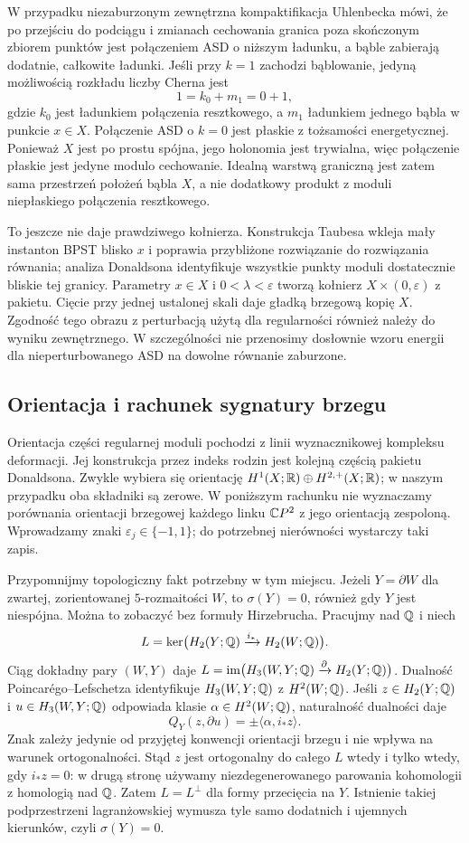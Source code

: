 W przypadku niezaburzonym zewnętrzna kompaktifikacja
Uhlenbecka mówi, że po
przejściu do podciągu i zmianach cechowania granica
poza skończonym zbiorem punktów jest połączeniem
ASD o niższym ładunku, a bąble zabierają dodatnie,
całkowite ładunki. Jeśli przy $k=1$ zachodzi
bąblowanie, jedyną możliwością rozkładu liczby
Cherna jest
\[
 1=k_0+m_1=0+1,
\]
gdzie $k_0$ jest ładunkiem połączenia resztkowego,
a $m_1$ ładunkiem jednego bąbla w punkcie $x\in X$.
Połączenie ASD o $k=0$ jest płaskie z
tożsamości energetycznej. Ponieważ $X$ jest po
prostu spójna, jego holonomia jest trywialna, więc
połączenie płaskie jest jedyne modulo cechowanie.
Idealną warstwą graniczną jest zatem sama przestrzeń
położeń bąbla $X$, a nie dodatkowy produkt z moduli
niepłaskiego połączenia resztkowego.

To jeszcze nie daje prawdziwego kołnierza. Konstrukcja
Taubesa wkleja mały instanton BPST blisko $x$ i
poprawia przybliżone rozwiązanie do rozwiązania
równania; analiza Donaldsona identyfikuje wszystkie
punkty moduli dostatecznie bliskie tej granicy.
Parametry $x\in X$ i $0<\lambda<\varepsilon$
tworzą kołnierz $X\times(0,\varepsilon)$ z pakietu.
Cięcie przy jednej ustalonej skali daje gładką
brzegową kopię $X$. Zgodność tego obrazu z perturbacją
użytą dla regularności również należy do wyniku
zewnętrznego. W szczególności nie przenosimy
dosłownie wzoru energii dla nieperturbowanego ASD
na dowolne równanie zaburzone.

\subsection*{Orientacja i rachunek sygnatury brzegu}

Orientacja części regularnej moduli pochodzi z linii
wyznacznikowej kompleksu deformacji. Jej konstrukcja
przez indeks rodzin jest kolejną częścią pakietu
Donaldsona. Zwykle wybiera się orientację
$H^1(X;\mathbb{R})\oplus H^{2,+}(X;\mathbb{R})$; w naszym przypadku
oba składniki są zerowe. W poniższym rachunku nie
wyznaczamy porównania orientacji brzegowej każdego
linku $\mathbb{C} P^2$ z jego orientacją zespoloną.
Wprowadzamy znaki $\varepsilon_j\in\{-1,1\}$;
do potrzebnej nierówności wystarczy taki zapis.

Przypomnijmy topologiczny fakt potrzebny w tym
miejscu. Jeżeli $Y=\partial W$ dla zwartej,
zorientowanej $5$-rozmaitości $W$, to $\sigma(Y)=0$,
również gdy $Y$ jest niespójna. Można to zobaczyć
bez formuły Hirzebrucha. Pracujmy nad $\mathbb{Q}$ i niech
\[
 L=\ker\bigl(H_2(Y;\mathbb{Q})\xrightarrow{i_*}H_2(W;\mathbb{Q})\bigr).
\]
Ciąg dokładny pary $(W,Y)$ daje
$L=\operatorname{im}\bigl(H_3(W,Y;\mathbb{Q})
\xrightarrow{\partial}H_2(Y;\mathbb{Q})\bigr)$.
Dualność Poincarégo--Lefschetza identyfikuje
$H_3(W,Y;\mathbb{Q})$ z $H^2(W;\mathbb{Q})$. Jeśli $z\in H_2(Y;\mathbb{Q})$
i $u\in H_3(W,Y;\mathbb{Q})$ odpowiada klasie
$\alpha\in H^2(W;\mathbb{Q})$, naturalność dualności daje
\[
 Q_Y(z,\partial u)=\pm\langle\alpha,i_*z\rangle.
\]
Znak zależy jedynie od przyjętej konwencji orientacji
brzegu i nie wpływa na warunek ortogonalności.
Stąd $z$ jest ortogonalny do całego $L$ wtedy i tylko
wtedy, gdy $i_*z=0$: w drugą stronę używamy
niezdegenerowanego parowania kohomologii z homologią
nad $\mathbb{Q}$. Zatem $L=L^\perp$ dla formy przecięcia
na $Y$. Istnienie takiej podprzestrzeni lagranżowskiej
wymusza tyle samo dodatnich i ujemnych kierunków,
czyli $\sigma(Y)=0$.

